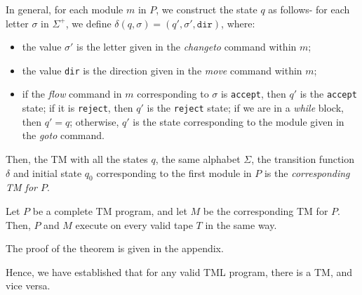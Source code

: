 In general, for each module $m$ in $P$, we construct the state $q$ as follows- for each letter $\sigma$ in $\Sigma^+$, we define $\delta(q, \sigma) = (q', \sigma', \texttt{dir})$, where:
\begin{itemize}
    \item the value $\sigma'$ is the letter given in the \textit{changeto} command within $m$;
    \item the value \texttt{dir} is the direction given in the \textit{move} command within $m$;
    \item if the \textit{flow} command in $m$ corresponding to $\sigma$ is \texttt{accept}, then $q'$ is the \texttt{accept} state; if it is \texttt{reject}, then $q'$ is the \texttt{reject} state; if we are in a \textit{while} block, then $q' = q$; otherwise, $q'$ is the state corresponding to the module given in the \textit{goto} command.
\end{itemize}
Then, the TM with all the states $q$, the same alphabet $\Sigma$, the transition function $\delta$ and initial state $q_0$ corresponding to the first module in $P$ is the \emph{corresponding TM for $P$}.

\begin{theorem}
    Let $P$ be a complete TM program, and let $M$ be the corresponding TM for $P$. Then, $P$ and $M$ execute on every valid tape $T$ in the same way.
\end{theorem}
The proof of the theorem is given in the appendix.

Hence, we have established that for any valid TML program, there is a TM, and vice versa.
